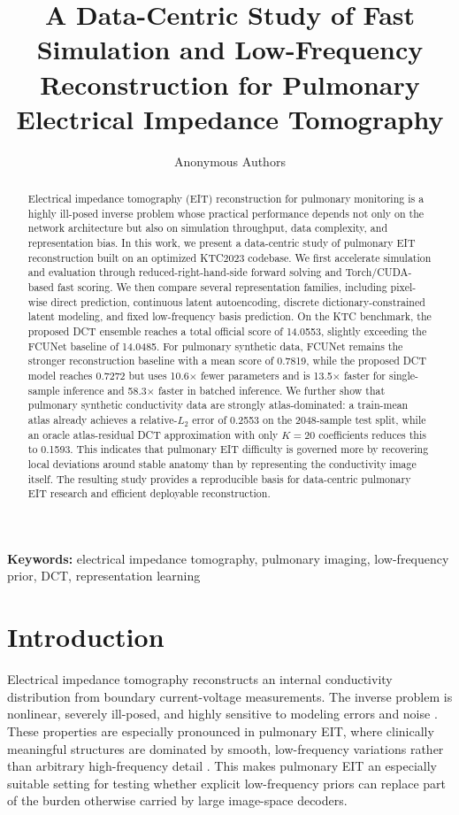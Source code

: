 \documentclass[11pt,a4paper]{article}
\title{A Data-Centric Study of Fast Simulation and Low-Frequency Reconstruction for Pulmonary Electrical Impedance Tomography}
\author{Anonymous Authors}
\date{}
\begin{document}
\maketitle

\begin{abstract}
Electrical impedance tomography (EIT) reconstruction for pulmonary monitoring is a highly ill-posed inverse problem whose practical performance depends not only on the network architecture but also on simulation throughput, data complexity, and representation bias. In this work, we present a data-centric study of pulmonary EIT reconstruction built on an optimized KTC2023 codebase. We first accelerate simulation and evaluation through reduced-right-hand-side forward solving and Torch/CUDA-based fast scoring. We then compare several representation families, including pixel-wise direct prediction, continuous latent autoencoding, discrete dictionary-constrained latent modeling, and fixed low-frequency basis prediction. On the KTC benchmark, the proposed DCT ensemble reaches a total official score of 14.0553, slightly exceeding the FCUNet baseline of 14.0485. For pulmonary synthetic data, FCUNet remains the stronger reconstruction baseline with a mean score of 0.7819, while the proposed DCT model reaches 0.7272 but uses 10.6$\times$ fewer parameters and is 13.5$\times$ faster for single-sample inference and 58.3$\times$ faster in batched inference. We further show that pulmonary synthetic conductivity data are strongly atlas-dominated: a train-mean atlas already achieves a relative-$L_2$ error of 0.2553 on the 2048-sample test split, while an oracle atlas-residual DCT approximation with only $K=20$ coefficients reduces this to 0.1593. This indicates that pulmonary EIT difficulty is governed more by recovering local deviations around stable anatomy than by representing the conductivity image itself. The resulting study provides a reproducible basis for data-centric pulmonary EIT research and efficient deployable reconstruction.
\end{abstract}

\noindent\textbf{Keywords:} electrical impedance tomography, pulmonary imaging, low-frequency prior, DCT, representation learning

\section{Introduction}
Electrical impedance tomography reconstructs an internal conductivity distribution from boundary current-voltage measurements. The inverse problem is nonlinear, severely ill-posed, and highly sensitive to modeling errors and noise \cite{cheney1999eit}. These properties are especially pronounced in pulmonary EIT, where clinically meaningful structures are dominated by smooth, low-frequency variations rather than arbitrary high-frequency detail \cite{frerichs2017consensus}. This makes pulmonary EIT an especially suitable setting for testing whether explicit low-frequency priors can replace part of the burden otherwise carried by large image-space decoders.
\end{document}
